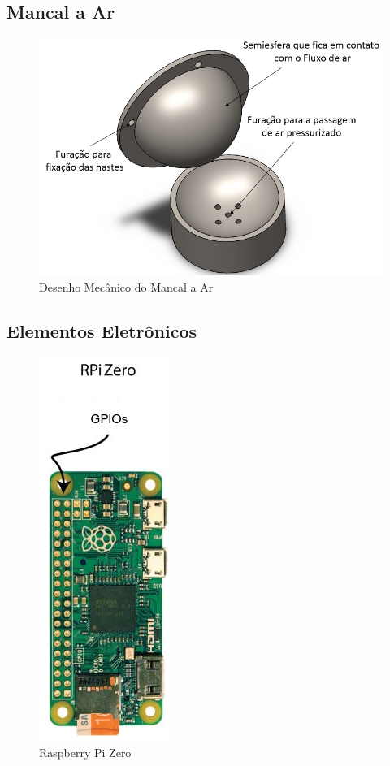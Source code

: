 \subsection{Mancal a Ar}

\begin{figure}[H]
  \caption{Desenho Mecânico do Mancal a Ar}
  \begin{center}
      \includegraphics[scale=.45]{img/base_desenho}
  \end{center}
  \label{fig:base_desenho}
\end{figure}

\subsection{Elementos Eletrônicos}

\begin{figure}[H]
  \caption{Raspberry Pi Zero}
  \begin{center}
      \includegraphics[scale=.55]{img/rasp_zero}
  \end{center}
  \label{fig:rasp_zero}
\end{figure}


